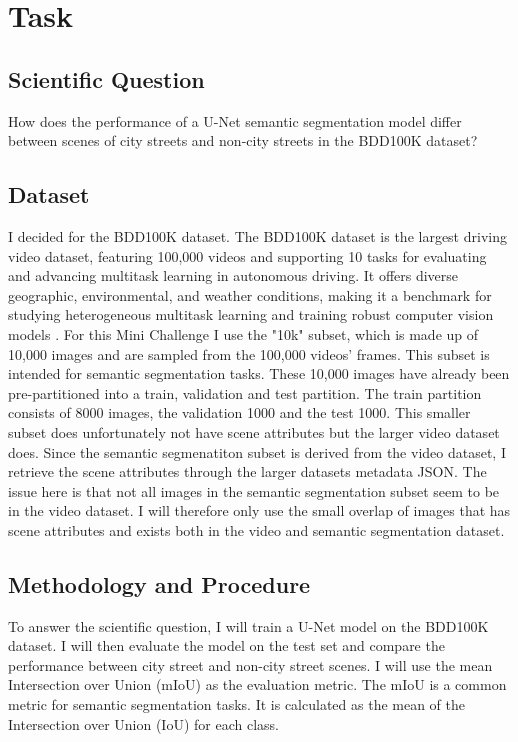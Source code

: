 \chapter{Task}

\section{Scientific Question}

How does the performance of a U-Net semantic segmentation model differ between scenes of city streets and non-city streets in the BDD100K dataset?

\section{Dataset}

I decided for the BDD100K dataset. The BDD100K dataset is the largest driving video dataset, featuring 100,000 videos and supporting 10 tasks for evaluating and advancing multitask learning in autonomous driving. It offers diverse geographic, environmental, and weather conditions, making it a benchmark for studying heterogeneous multitask learning and training robust computer vision models \cite{yuBDD100KDiverseDriving2020}. For this Mini Challenge I use the "10k" subset, which is made up of 10,000 images and are sampled from the 100,000 videos' frames. This subset is intended for semantic segmentation tasks. These 10,000 images have already been pre-partitioned into a train, validation and test partition. The train partition consists of 8000 images, the validation 1000 and the test 1000. This smaller subset does unfortunately not have scene attributes but the larger video dataset does. Since the semantic segmenatiton subset is derived from the video dataset, I retrieve the scene attributes through the larger datasets metadata JSON. The issue here is that not all images in the semantic segmentation subset seem to be in the video dataset. I will therefore only use the small overlap of images that has scene attributes and exists both in the video and semantic segmentation dataset.

\section{Methodology and Procedure}

To answer the scientific question, I will train a U-Net model on the BDD100K dataset. I will then evaluate the model on the test set and compare the performance between city street and non-city street scenes. I will use the mean Intersection over Union (mIoU) as the evaluation metric. The mIoU is a common metric for semantic segmentation tasks. It is calculated as the mean of the Intersection over Union (IoU) for each class.